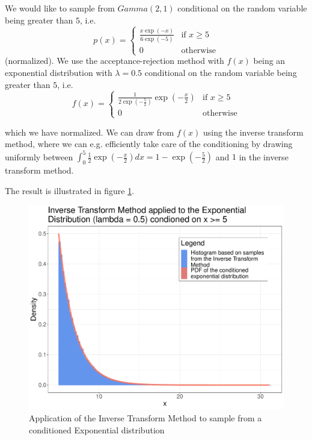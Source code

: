 
We would like to sample from $Gamma(2,1)$ conditional on the random variable being greater than $5$, i.e.
\begin{equation}
    p(x) = \begin{cases}
        \frac{x \exp(-x)}{6\exp(-5)} & \text{if } x \geq 5 \\
        0 & \text{otherwise}
    \end{cases}
\end{equation}
(normalized). We use the acceptance-rejection method with $f(x)$ being an exponential distribution with $\lambda = 0.5$ conditional on the random variable being greater than $5$, i.e.
\begin{equation}
    f(x) = \begin{cases}
        \frac{1}{2 \exp\left(-\frac{5}{2}\right)} \exp(-\frac{x}{2}) & \text{if } x \geq 5 \\
        0 & \text{otherwise}
    \end{cases}
\end{equation}

which we have normalized. We can draw from $f(x)$ using the inverse transform method, where we can e.g. efficiently take care of the conditioning by
drawing uniformly between $\int_{0}^{5} \frac{1}{2} \exp(-\frac{x}{2}) dx = 1 - \exp\left(-\frac{5}{2}\right)$ and $1$ in the inverse transform method.

The result is illustrated in figure \ref{fig:exp_conditional}.

\begin{figure}[!htb]
    \centering
    \includegraphics[width=1.0\textwidth]{figures/exp_conditional.pdf}\hfill
    \caption{Application of the Inverse Transform Method to sample from a conditioned Exponential distribution}
    \label{fig:exp_conditional}
\end{figure}

